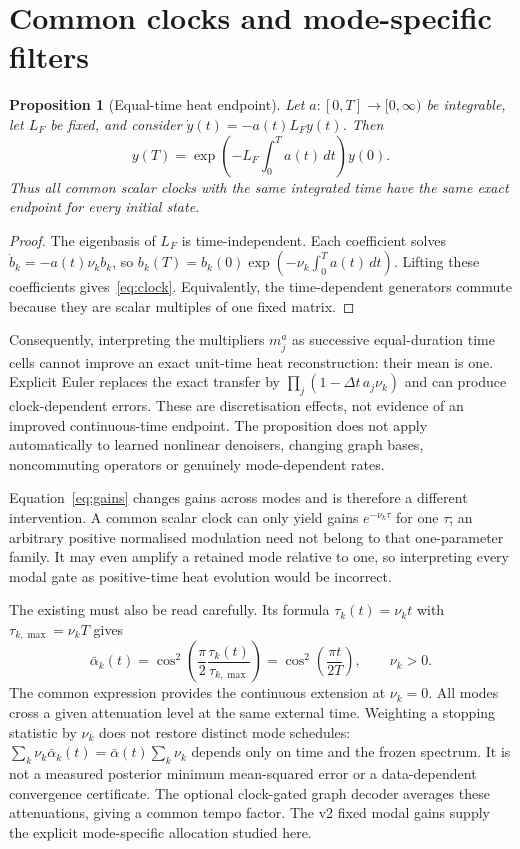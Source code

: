 \documentclass[10pt]{article}
\newtheorem{proposition}{Proposition}
\newcommand{\Lf}{L_F}
\newcommand{\code}[1]{\texttt{\detokenize{#1}}}
\begin{document}
\section{Common clocks and mode-specific filters}
\label{sec:clock}

\begin{proposition}[Equal-time heat endpoint]
Let $a:[0,T]\rightarrow[0,\infty)$ be integrable, let $\Lf$ be fixed,
and consider $\dot y(t)=-a(t)\Lf y(t)$. Then
\begin{equation}
 y(T)=\exp\!\left(-\Lf\int_0^T a(t)\,dt\right)y(0).
 \label{eq:clock}
\end{equation}
Thus all common scalar clocks with the same integrated time have the
same exact endpoint for every initial state.
\end{proposition}
\begin{proof}
The eigenbasis of $\Lf$ is time-independent. Each coefficient solves
$\dot b_k=-a(t)\nu_k b_k$, so
$b_k(T)=b_k(0)\exp(-\nu_k\int_0^T a(t)\,dt)$. Lifting these coefficients
gives~\eqref{eq:clock}. Equivalently, the time-dependent generators
commute because they are scalar multiples of one fixed matrix.
\end{proof}

Consequently, interpreting the multipliers $m_j^a$ as successive
equal-duration time cells cannot improve an exact unit-time heat
reconstruction: their mean is one. Explicit Euler replaces the exact
transfer by $\prod_j(1-\Delta t\,a_j\nu_k)$ and can produce
clock-dependent errors. These are discretisation effects, not evidence
of an improved continuous-time endpoint. The proposition does not
apply automatically to learned nonlinear denoisers, changing graph
bases, noncommuting operators or genuinely mode-dependent rates.

Equation~\eqref{eq:gains} changes gains across modes and is therefore
a different intervention. A common scalar clock can only yield gains
$e^{-\nu_k\tau}$ for one $\tau$; an arbitrary positive normalised
modulation need not belong to that one-parameter family. It may even
amplify a retained mode relative to one, so interpreting every modal
gate as positive-time heat evolution would be incorrect.

The existing \code{SpectralSchedule} must also be read carefully. Its
formula $\tau_k(t)=\nu_k t$ with $\tau_{k,\max}=\nu_k T$ gives
\begin{equation}
 \bar\alpha_k(t)=
 \cos^2\!\left(\frac{\pi}{2}\frac{\tau_k(t)}{\tau_{k,\max}}\right)
 =\cos^2\!\left(\frac{\pi t}{2T}\right),\qquad \nu_k>0.
 \label{eq:cancellation}
\end{equation}
The common expression provides the continuous extension at $\nu_k=0$.
All modes cross a given attenuation level at the same external time.
Weighting a stopping statistic by $\nu_k$ does not restore distinct
mode schedules:
$\sum_k\nu_k\bar\alpha_k(t)=\bar\alpha(t)\sum_k\nu_k$ depends only
on time and the frozen spectrum. It is not a measured posterior
minimum mean-squared error or a data-dependent convergence certificate.
The optional clock-gated graph decoder averages these attenuations,
giving a common tempo factor. The v2 fixed modal gains supply the
explicit mode-specific allocation studied here.
\end{document}
